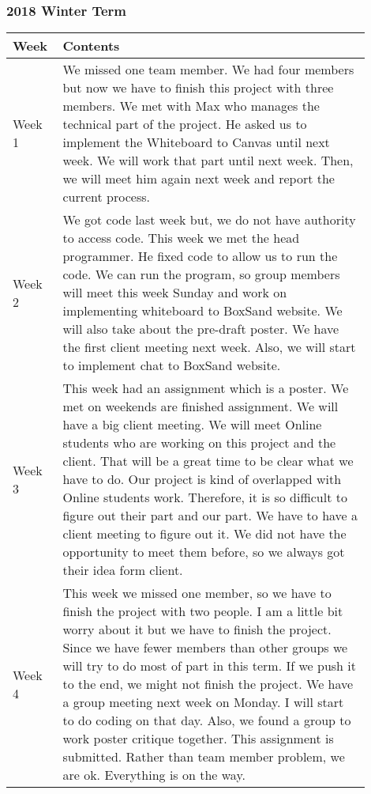 \documentclass[10pt]{article}
\begin{document}
        \subsubsection{2018 Winter Term}
            \begin{center}
            \begin{tabular}{ | p{0.1\linewidth} | p{0.8\linewidth} | } \hline
                Week & Contents  \\ \hline
                Week 1 & We missed one team member. We had four members but now we have to finish this project with three members. We met with Max who manages the technical part of the project. He asked us to implement the Whiteboard to  Canvas until next week. We will work that part until next week. Then, we will meet him again next week and report the current process.   \\ \hline
                Week 2 &  We got code last week but, we do not have authority to access code. This week we met the head programmer. He fixed code to allow us to run the code. We can run the program, so group members will meet this week Sunday and work on implementing whiteboard to BoxSand website. We will also take about the pre-draft poster. We have the first client meeting next week. Also, we will start to implement chat to BoxSand website. \\ \hline
                Week 3 & This week had an assignment which is a poster. We met on weekends are finished assignment. We will have a big client meeting. We will meet Online students who are working on this project and the client. That will be a great time to be clear what we have to do. Our project is kind of overlapped with  Online students work. Therefore, it is so difficult to figure out their part and our part. We have to have a client meeting to figure out it. We did not have the opportunity to meet them before, so we always got their idea form client.   \\ \hline
                Week 4 & This week we missed one member, so we have to finish the project with two people. I am a little bit worry about it but we have to finish the project. Since we have fewer members than other groups we will try to do most of part in this term. If we push it to the end, we might not finish the project. We have a  group meeting next week on Monday. I will start to do coding on that day. Also, we found a group to work poster critique together. This assignment is submitted. Rather than team member problem, we are ok. Everything is on the way.    \\ \hline

\end{tabular}
\end{center}
\end{document}
